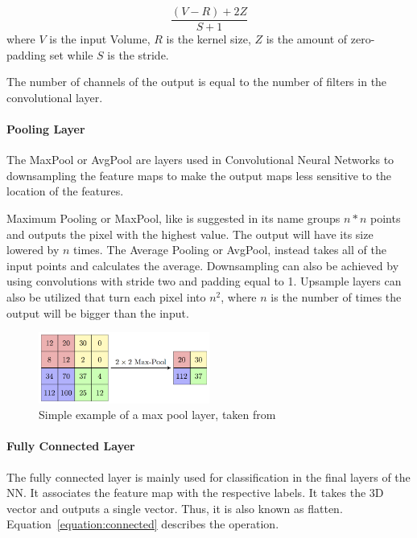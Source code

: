 \begin{equation} \label{equation:padding}
  \frac{(V-R)+2Z}{S+1}
\end{equation}
where $V$ is the input Volume, $R$ is the kernel size, $Z$ is the amount of zero-padding set while $S$ is the stride.

The number of channels of the output is equal to the number of filters in the
convolutional layer.


\paragraph{Pooling Layer}

The MaxPool or AvgPool are layers used in Convolutional Neural Networks to
downsampling the feature maps to make the output maps less sensitive to the
location of the features.

Maximum Pooling or MaxPool, like is suggested in its name groups $ n * n $
points and outputs the pixel with the highest value.  The output will have its size
lowered by $n$ times.  The Average Pooling or AvgPool, instead takes all of
the input points and calculates the average. Downsampling can also be achieved
by using convolutions with stride two and padding equal to 1.  Upsample layers can
also be utilized that turn each pixel into $n^{2}$, where $n$ is the number of times
the output will be bigger than the input.

\begin{figure}[!htbp]
    \centering
    \includegraphics[width=0.5\textwidth]{Figures/maxpool.png}
    \caption{Simple example of a max pool layer, taken from~\cite{maxpoolimg}}
    \label{figure:maxpool}
\end{figure} 
 

\paragraph{Fully Connected Layer}

The fully connected layer is mainly used for classification in the final layers
of the NN. It associates the feature map with the respective labels.  It takes the
3D vector and outputs a single vector. Thus, it is also known as flatten.
Equation~\ref{equation:connected} describes the operation.

